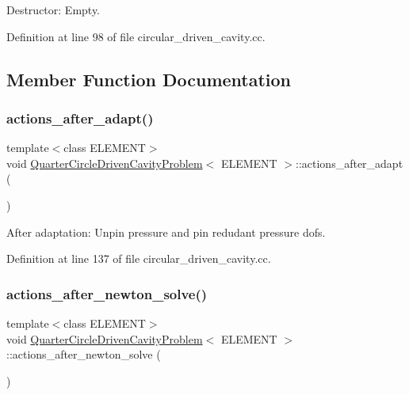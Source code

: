 Destructor\+: Empty. 



Definition at line 98 of file circular\+\_\+driven\+\_\+cavity.\+cc.



\subsection{Member Function Documentation}
\mbox{\label{classQuarterCircleDrivenCavityProblem_a4873f31ccf76e340abb284b17430c407}} 
\subsubsection{\texorpdfstring{actions\+\_\+after\+\_\+adapt()}{actions\_after\_adapt()}}
{\footnotesize\ttfamily template$<$class E\+L\+E\+M\+E\+NT$>$ \\
void \hyperlink{classQuarterCircleDrivenCavityProblem}{Quarter\+Circle\+Driven\+Cavity\+Problem}$<$ E\+L\+E\+M\+E\+NT $>$\+::actions\+\_\+after\+\_\+adapt (\begin{DoxyParamCaption}{ }\end{DoxyParamCaption})\hspace{0.3cm}{\ttfamily [inline]}}



After adaptation\+: Unpin pressure and pin redudant pressure dofs. 



Definition at line 137 of file circular\+\_\+driven\+\_\+cavity.\+cc.

\mbox{\label{classQuarterCircleDrivenCavityProblem_ad2ed0b3e89e1cd0e28cc61ae4fd129bc}} 
\subsubsection{\texorpdfstring{actions\+\_\+after\+\_\+newton\+\_\+solve()}{actions\_after\_newton\_solve()}}
{\footnotesize\ttfamily template$<$class E\+L\+E\+M\+E\+NT$>$ \\
void \hyperlink{classQuarterCircleDrivenCavityProblem}{Quarter\+Circle\+Driven\+Cavity\+Problem}$<$ E\+L\+E\+M\+E\+NT $>$\+::actions\+\_\+after\+\_\+newton\+\_\+solve (\begin{DoxyParamCaption}{ }\end{DoxyParamCaption})\hspace{0.3cm}{\ttfamily [inline]}}



